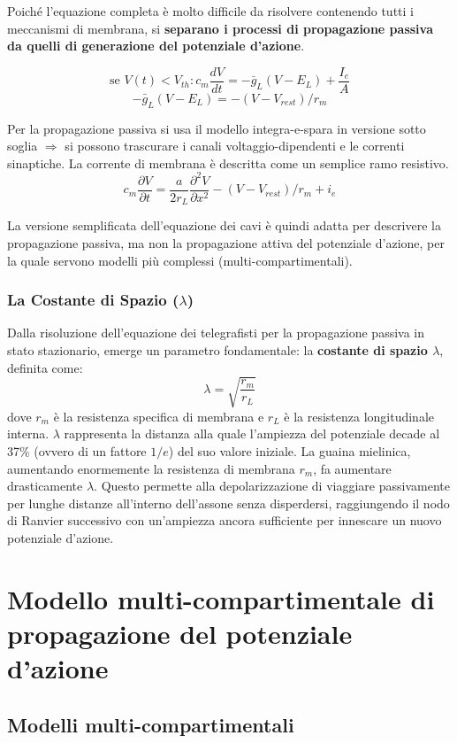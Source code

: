 \documentclass[12pt,a4paper,openany]{book}
\begin{document}
Poiché l’equazione completa è molto difficile da risolvere contenendo tutti i meccanismi di membrana, si \textbf{separano i processi di propagazione passiva da quelli di generazione del potenziale d’azione}. 

$$\text{se } V(t) < V_{th} : c_m \frac{dV}{dt} = -\bar{g}_L(V - E_L) + \frac{I_e}{A}$$
$$-\bar{g}_L(V - E_L) = -(V - V_{rest})/r_m$$

Per la propagazione passiva si usa il modello integra-e-spara in versione sotto soglia $\Rightarrow$ si possono trascurare i canali voltaggio-dipendenti e le correnti sinaptiche. La corrente di membrana è descritta come un semplice ramo resistivo.
$$c_m \frac{\partial V}{\partial t} = \frac{a}{2r_L} \frac{\partial^2 V}{\partial x^2} - (V - V_{rest})/r_m + i_e$$

La versione semplificata dell’equazione dei cavi è quindi adatta per descrivere la propagazione passiva, ma non la propagazione attiva del potenziale d’azione, per la quale servono modelli più complessi (multi-compartimentali).

\subsubsection{La Costante di Spazio ($\lambda$)}
Dalla risoluzione dell’equazione dei telegrafisti per la propagazione passiva in stato stazionario, emerge un parametro fondamentale: la \textbf{costante di spazio $\lambda$}, definita come:
\[ \lambda = \sqrt{\frac{r_m}{r_L}} \]
dove $r_m$ è la resistenza specifica di membrana e $r_L$ è la resistenza longitudinale interna. 
$\lambda$ rappresenta la distanza alla quale l’ampiezza del potenziale decade al 37\% (ovvero di un fattore $1/e$) del suo valore iniziale. La guaina mielinica, aumentando enormemente la resistenza di membrana $r_m$, fa aumentare drasticamente $\lambda$. Questo permette alla depolarizzazione di viaggiare passivamente per lunghe distanze all’interno dell’assone senza disperdersi, raggiungendo il nodo di Ranvier successivo con un’ampiezza ancora sufficiente per innescare un nuovo potenziale d’azione.


\section{Modello multi-compartimentale di propagazione del potenziale d’azione}

\subsection{Modelli multi-compartimentali}
\end{document}
